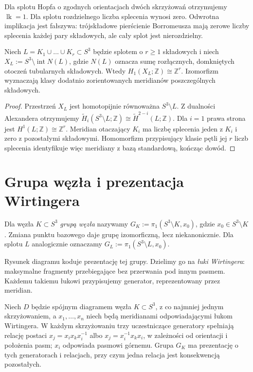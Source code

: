 \begin{przyklad}
Dla splotu Hopfa o zgodnych orientacjach dwóch skrzyżowań
otrzymujemy $\operatorname{lk}=1$. Dla splotu rozdzielnego
liczba splecenia wynosi zero. Odwrotna implikacja jest fałszywa:
trójskładowe pierścienie Borromeusza mają zerowe liczby splecenia
każdej pary składowych, ale cały splot jest nierozdzielny.
\end{przyklad}

\begin{twierdzenie}
Niech $L=K_1\cup\dots\cup K_r\subset S^3$ będzie splotem o $r\geq1$
składowych i niech $X_L:=S^3\setminus\operatorname{int}N(L)$,
gdzie $N(L)$ oznacza sumę rozłącznych, domkniętych otoczeń
tubularnych składowych. Wtedy
$H_1(X_L;\mathbb Z)\cong\mathbb Z^r$.
Izomorfizm wyznaczają klasy dodatnio zorientowanych meridianów
poszczególnych składowych.
\end{twierdzenie}

\begin{proof}
Przestrzeń $X_L$ jest homotopijnie równoważna $S^3\setminus L$.
Z dualności Alexandera otrzymujemy
$\widetilde H_i(S^3\setminus L;\mathbb Z)
\cong\widetilde H^{2-i}(L;\mathbb Z)$.
Dla $i=1$ prawa strona jest $H^1(L;\mathbb Z)\cong\mathbb Z^r$.
Meridian otaczający $K_i$ ma liczbę splecenia jeden z $K_i$
i zero z pozostałymi składowymi. Homomorfizm przypisujący
klasie pętli jej $r$ liczb splecenia identyfikuje więc
meridiany z bazą standardową, kończąc dowód.
\end{proof}

\section{Grupa węzła i prezentacja Wirtingera}
\label{sec:kt-wirtinger}

\begin{definicja}
Dla węzła $K\subset S^3$ \emph{grupą węzła} nazywamy
$G_K:=\pi_1(S^3\setminus K,x_0)$, gdzie $x_0\in S^3\setminus K$.
Zmiana punktu bazowego daje grupę izomorficzną, lecz niekanonicznie.
Dla splotu $L$ analogicznie oznaczamy $G_L:=\pi_1(S^3\setminus L,x_0)$.
\end{definicja}

Rysunek diagramu koduje prezentację tej grupy. Dzielimy go na
\emph{łuki Wirtingera}: maksymalne fragmenty przebiegające
bez przerwania pod innym pasmem. Każdemu takiemu łukowi
przypisujemy generator, reprezentowany przez meridian.

\begin{twierdzenie}
Niech $D$ będzie spójnym diagramem węzła $K\subset S^3$,
z co najmniej jednym skrzyżowaniem, a $x_1,\dots,x_n$ niech będą
meridianami odpowiadającymi łukom Wirtingera. W każdym skrzyżowaniu
trzy uczestniczące generatory spełniają relację postaci
$x_j=x_i x_k x_i^{-1}$ albo $x_j=x_i^{-1}x_kx_i$,
w zależności od orientacji i położenia pasm; $x_i$ odpowiada
pasmowi górnemu. Grupa $G_K$ ma prezentację o tych generatorach
i relacjach, przy czym jedna relacja jest konsekwencją pozostałych.
\end{twierdzenie}

